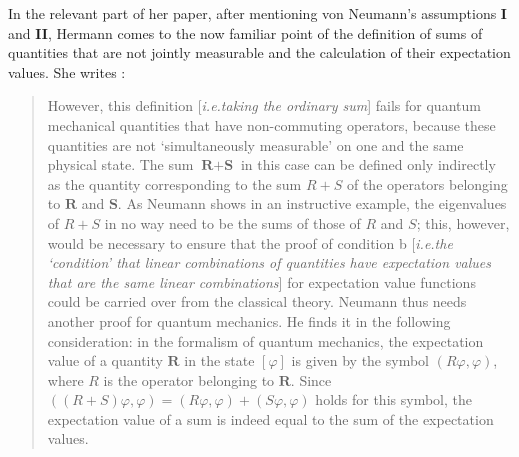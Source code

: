 \documentclass[11pt]{article}
\begin{document}
In the relevant part of her paper, after mentioning von Neumann's assumptions \textbf{I} and \textbf{II}, Hermann comes to the now familiar point of the definition of sums of quantities that are not jointly measurable and the calculation of their expectation values. She writes \cite[p.\@ 250]{crull}:
\begin{quote}
However, this definition [\emph{i.e.\@ taking the ordinary sum}] fails for quantum mechanical quantities that have non-commuting
operators, because these quantities are not `simultaneously measurable' on one and the same physical state. The sum $\textbf{R} + \textbf{S}$ in this case can be defined only indirectly as the quantity corresponding to the sum $R + S$ of the operators belonging to $\textbf{R}$ and $\textbf{S}$. As Neumann shows in an instructive example, the eigenvalues of $R + S$ in no way need to be the sums of those of $R$ and $S$;
this, however, would be necessary to ensure that the proof of condition b [\emph{i.e.\@ the `condition' that linear combinations of quantities have expectation values that are the same linear combinations}] for expectation value functions could be carried over from the classical theory. Neumann thus needs another proof for quantum mechanics. He finds it in the following consideration: in the formalism of quantum mechanics, the expectation value of a quantity $\textbf{R}$ in the state $[\varphi]$ is given by the symbol $(R\varphi,\varphi)$, where $R$ is the operator belonging to $\textbf{R}$. Since $((R + S)\varphi, \varphi) = (R\varphi, \varphi)+ (S\varphi, \varphi)$ holds for this symbol, the expectation value of a sum is indeed equal to the sum of the expectation values.
\end{quote}
\end{document}
